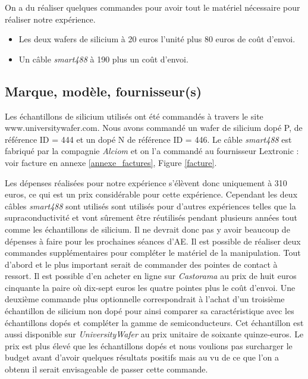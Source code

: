 \bigskip
On a du réaliser quelques commandes pour avoir tout le matériel nécessaire pour réaliser notre expérience.

\begin{itemize}
  \item Les deux wafers de silicium à 20 euros l'unité plus 80 euros de coût d'envoi.
  \item Un câble \emph{smart488} à 190 plus un coût d'envoi.
\end{itemize}

\subsection{Marque, modèle, fournisseur(s)}
Les échantillons de silicium utilisés ont été commandés à travers le site www.universitywafer.com. Nous avons commandé un wafer de silicium dopé P, de référence ID = 444  et un dopé N de référence ID = 446. Le câble \emph{smart488} est fabriqué par la compagnie \emph{Alciom} et on l'a commandé au fournisseur Lextronic : voir facture en annexe \ref{annexe_factures}, Figure \ref{facture}.

Les dépenses réalisées pour notre expérience s'élèvent donc uniquement à 310 euros, ce qui est un prix considérable pour cette expérience. Cependant les deux câbles \emph{smart488} sont utilisés sont utilisés pour d'autres expériences telles que la supraconductivité et vont sûrement être réutilisés pendant plusieurs années tout comme les échantillons de silicium. Il ne devrait donc pas y avoir beaucoup de dépenses à faire pour les prochaines séances d'AE.
Il est possible de réaliser deux commandes supplémentaires pour compléter le matériel de la manipulation.
Tout d'abord et le plus important serait de commander des pointes de contact à ressort. Il est possible d'en acheter en ligne sur \emph{Castorama} au prix de huit euros cinquante la paire où dix-sept euros les quatre pointes plus le coût d'envoi.
Une deuxième commande plus optionnelle correspondrait à l'achat d'un troisième échantillon de silicium non dopé pour ainsi comparer sa caractéristique avec les échantillons dopés et compléter la gamme de semiconducteurs. Cet échantillon est aussi disponible sur \emph{UniversityWafer} au prix unitaire de soixante quinze-euros. Le prix est plus élevé que les échantillons dopés et nous voulions pas surcharger le budget avant d'avoir quelques résultats positifs mais au vu de ce que l'on a obtenu il serait envisageable de passer cette commande.
